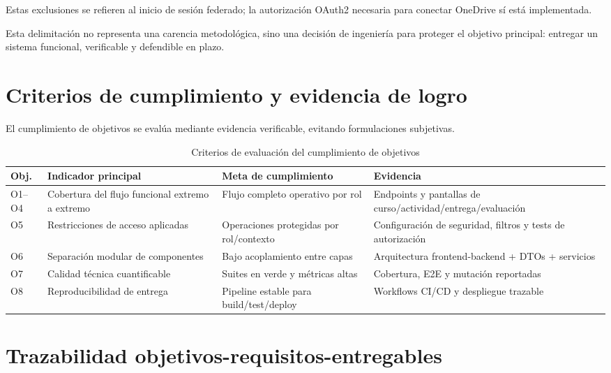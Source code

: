 	Estas exclusiones se refieren al inicio de sesi\'on federado; la autorizaci\'on OAuth2 necesaria para conectar OneDrive s\'i est\'a implementada.

Esta delimitaci\'on no representa una carencia metodol\'ogica,
sino una decisi\'on de ingenier\'ia para proteger el objetivo principal:
entregar un sistema funcional, verificable y defendible en plazo.

\FloatBarrier
\section{Criterios de cumplimiento y evidencia de logro}

El cumplimiento de objetivos se eval\'ua mediante evidencia verificable,
evitando formulaciones subjetivas.

\begin{table}[!htbp]
\centering
\begin{tabular}{|P{2cm}|P{3.4cm}|P{3.3cm}|P{3.7cm}|}
\hline
\textbf{Obj.} & \textbf{Indicador principal} & \textbf{Meta de cumplimiento} & \textbf{Evidencia} \\
\hline
O1--O4 & Cobertura del flujo funcional extremo a extremo & Flujo completo operativo por rol & Endpoints y pantallas de curso/actividad/entrega/evaluaci\'on \\
\hline
O5 & Restricciones de acceso aplicadas & Operaciones protegidas por rol/contexto & Configuraci\'on de seguridad, filtros y tests de autorizaci\'on \\
\hline
O6 & Separaci\'on modular de componentes & Bajo acoplamiento entre capas & Arquitectura frontend-backend + DTOs + servicios \\
\hline
O7 & Calidad t\'ecnica cuantificable & Suites en verde y m\'etricas altas & Cobertura, E2E y mutaci\'on reportadas \\
\hline
O8 & Reproducibilidad de entrega & Pipeline estable para build/test/deploy & Workflows CI/CD y despliegue trazable \\
\hline
\end{tabular}
\caption{Criterios de evaluaci\'on del cumplimiento de objetivos}
\label{tab:criterios-cumplimiento-objetivos}
\end{table}

\FloatBarrier
\section{Trazabilidad objetivos-requisitos-entregables}


